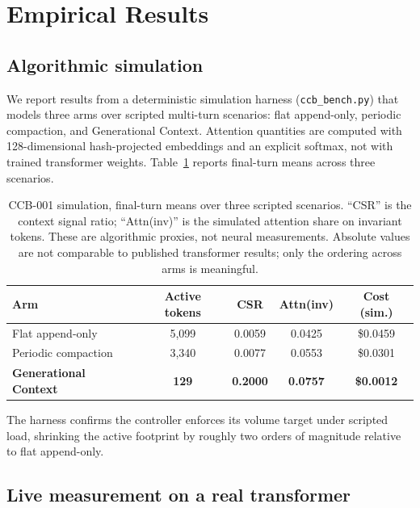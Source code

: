 ﻿\documentclass[11pt,a4paper]{article}
\theoremstyle{plain}
\theoremstyle{definition}
\theoremstyle{remark}
\begin{document}
\section{Empirical Results}
\label{sec:sim}

\subsection{Algorithmic simulation}
\label{subsec:sim}

We report results from a deterministic simulation harness (\texttt{ccb\_bench.py})
that models three arms over scripted multi-turn scenarios:
flat append-only, periodic compaction, and Generational Context. Attention
quantities are computed with 128-dimensional hash-projected embeddings and an
explicit softmax, not with trained transformer weights. Table~\ref{tab:ccb}
reports final-turn means across three scenarios.

\begin{table}[ht]
\centering
\small
\begin{tabular}{lcccc}
\toprule
\textbf{Arm} & \textbf{Active tokens} & \textbf{CSR} & \textbf{Attn(inv)} & \textbf{Cost (sim.)} \\
\midrule
Flat append-only      & 5{,}099 & 0.0059 & 0.0425 & \$0.0459 \\
Periodic compaction   & 3{,}340 & 0.0077 & 0.0553 & \$0.0301 \\
\textbf{Generational Context} & \textbf{129} & \textbf{0.2000} & \textbf{0.0757} & \textbf{\$0.0012} \\
\bottomrule
\end{tabular}
\caption{CCB-001 simulation, final-turn means over three scripted scenarios.
``CSR'' is the context signal ratio; ``Attn(inv)'' is the simulated attention
share on invariant tokens. These are algorithmic proxies, not neural
measurements. Absolute values are not comparable to published transformer
results; only the ordering across arms is meaningful.}
\label{tab:ccb}
\end{table}

The harness confirms the controller enforces its volume target under scripted
load, shrinking the active footprint by roughly two orders of magnitude relative
to flat append-only.

\subsection{Live measurement on a real transformer}
\label{subsec:live}
\end{document}
